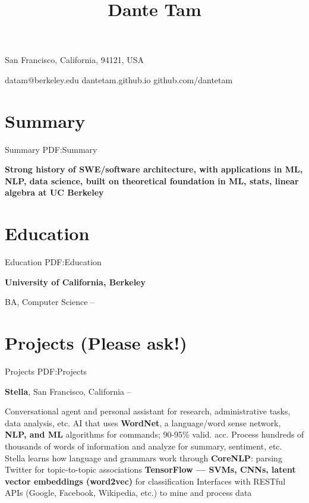 \documentclass[letterpaper,12pt,oneside]{article}
\newcommand{\CVAuthor}{Dante Tam}
\begin{document}
\thispagestyle{empty}


\title{\CVAuthor}

\begin{subtitle}
{San Francisco, California, 94121, USA}
\par
\end{subtitle}

\begin{center}
{\Large datam@berkeley.edu \qquad dantetam.github.io \qquad github.com/dantetam}
\end{center}

\begin{body}


\section
{Summary}
{Summary}
{PDF:Summary}

{\textbf{Strong history of SWE/software architecture, with applications in ML, NLP, data science, built on theoretical foundation in ML, stats, linear algebra at UC Berkeley}}


\section
{Education}
{Education}
{PDF:Education}

{\textbf{University of California, Berkeley}}

\GapNoBreak
\BulletItem
BA, Computer Science
\hfill
{} --

\GapNoBreak


\section
{Projects (Please ask!)}
{Projects}
{PDF:Projects}

{\textbf{Stella}}, San Francisco, California
\hfill
{} -- 
\GapNoBreak
\begin{detail}
\SubBulletItem
Conversational agent and personal assistant for research, administrative tasks, data analysis, etc.
\SubBulletItem
AI that uses \textbf{WordNet}, a language/word sense network, \textbf{NLP, and ML} algorithms for commands; 90-95\% valid. acc.
\SubBulletItem
Process hundreds of thousands of words of information and analyze for summary, sentiment, etc.
\SubBulletItem
Stella learns how language and grammars work through \textbf{CoreNLP}: parsing Twitter for topic-to-topic associations
\SubBulletItem
\textbf{TensorFlow — SVMs, CNNs, latent vector embeddings (word2vec)} for classification
\SubBulletItem
Interfaces with RESTful APIs (Google, Facebook, Wikipedia, etc.) to mine and process data
\end{detail}


\end{body}
\end{document}
